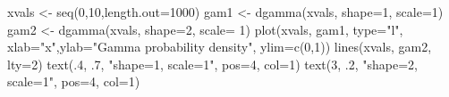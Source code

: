 \begin{Schunk}
\begin{Sinput}
 xvals <- seq(0,10,length.out=1000)
 gam1 <- dgamma(xvals, shape=1, scale=1)
 gam2 <- dgamma(xvals, shape=2, scale= 1)
 plot(xvals, gam1, type="l", xlab="x",ylab="Gamma probability density",  ylim=c(0,1))
 lines(xvals, gam2, lty=2)
 text(.4, .7, "shape=1, scale=1", pos=4, col=1)
 text(3, .2, "shape=2, scale=1", pos=4, col=1)
\end{Sinput}
\end{Schunk}

